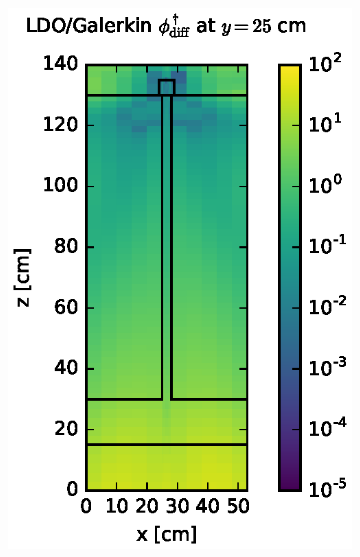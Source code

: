 \begin{figure}[!htb]
\begin{subfigure}{0.4\textwidth}
\includegraphics[max height=0.445\textheight]
{img/steel-plots/cad-adj/flux-diff-rel-gkn04.eps}
\end{subfigure}
\\
\begin{subfigure}{0.4\textwidth}

\end{subfigure}
\end{figure}
